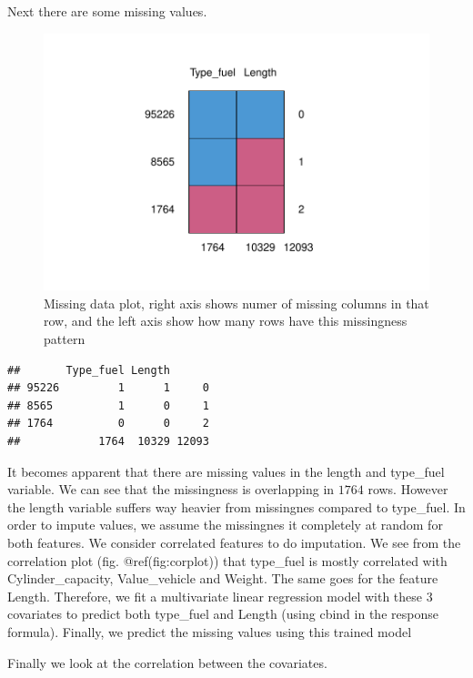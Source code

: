 \documentclass[
]{article}
\begin{document}
Next there are some missing values.

\begin{figure}

{\centering \includegraphics[width=0.5\linewidth]{assignment_uptodat_files/figure-latex/unnamed-chunk-6-1} 

}

\caption{Missing data plot, right axis shows numer of missing columns in that row, and the left axis show how many rows have this missingness pattern}\label{fig:unnamed-chunk-6}
\end{figure}

\begin{verbatim}
##       Type_fuel Length      
## 95226         1      1     0
## 8565          1      0     1
## 1764          0      0     2
##            1764  10329 12093
\end{verbatim}

It becomes apparent that there are missing values in the length and
type\_fuel variable. We can see that the missingness is overlapping in
\(1764\) rows. However the length variable suffers way heavier from
missingnes compared to type\_fuel. In order to impute values, we assume
the missingnes it completely at random for both features. We consider
correlated features to do imputation. We see from the correlation plot
(fig. @ref(fig:corplot)) that type\_fuel is mostly correlated with
Cylinder\_capacity, Value\_vehicle and Weight. The same goes for the
feature Length. Therefore, we fit a multivariate linear regression model
with these 3 covariates to predict both type\_fuel and Length (using
cbind in the response formula). Finally, we predict the missing values
using this trained model

Finally we look at the correlation between the covariates.
\end{document}
